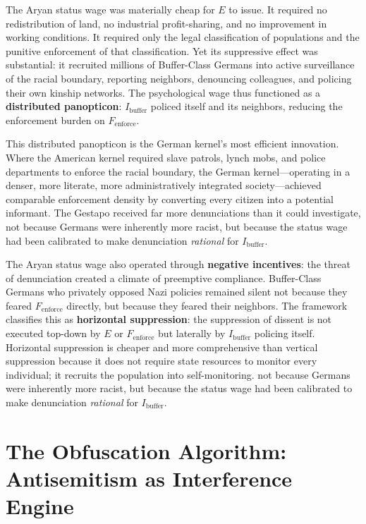 The Aryan status wage was materially cheap for $E$ to issue. It required no redistribution of land, no industrial profit-sharing, and no improvement in working conditions. It required only the legal classification of populations and the punitive enforcement of that classification. Yet its suppressive effect was substantial: it recruited millions of Buffer-Class Germans into active surveillance of the racial boundary, reporting neighbors, denouncing colleagues, and policing their own kinship networks. The psychological wage thus functioned as a \textbf{distributed panopticon}: $I_{\text{buffer}}$ policed itself and its neighbors, reducing the enforcement burden on $F_{\text{enforce}}$.

This distributed panopticon is the German kernel's most efficient innovation. Where the American kernel required slave patrols, lynch mobs, and police departments to enforce the racial boundary, the German kernel---operating in a denser, more literate, more administratively integrated society---achieved comparable enforcement density by converting every citizen into a potential informant. The Gestapo received far more denunciations than it could investigate, not because Germans were inherently more racist, but because the status wage had been calibrated to make denunciation \textit{rational} for $I_{\text{buffer}}$.

The Aryan status wage also operated through \textbf{negative incentives}: the threat of denunciation created a climate of preemptive compliance. Buffer-Class Germans who privately opposed Nazi policies remained silent not because they feared $F_{\text{enforce}}$ directly, but because they feared their neighbors. The framework classifies this as \textbf{horizontal suppression}: the suppression of dissent is not executed top-down by $E$ or $F_{\text{enforce}}$ but laterally by $I_{\text{buffer}}$ policing itself. Horizontal suppression is cheaper and more comprehensive than vertical suppression because it does not require state resources to monitor every individual; it recruits the population into self-monitoring. not because Germans were inherently more racist, but because the status wage had been calibrated to make denunciation \textit{rational} for $I_{\text{buffer}}$.

\section{The Obfuscation Algorithm: Antisemitism as Interference Engine}
\label{sec:obfuscation}

